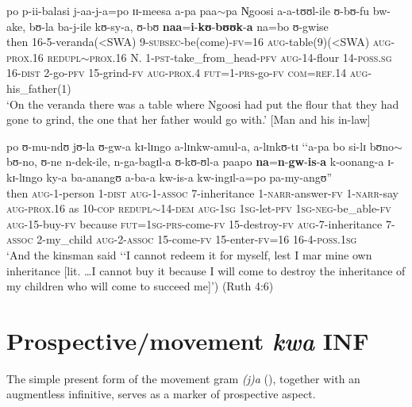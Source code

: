 \begin{exe}
\ex \label{exProclitNaaInLaw} \gll po p-ii-balasi j-aa-j-a=po ɪɪ-meesa a-pa paa$\sim$pa N̩goosi a-a-tʊʊl-ile ʊ-bʊ-fu bw-ake, bʊ-la ba-j-ile kʊ-sy-a, ʊ-bʊ \textbf{naa}=\textbf{i}-\textbf{kʊ}-\textbf{bʊʊk}-\textbf{a} na=bo ʊ-gwise\\
then 16-5-veranda(<SWA) 9-\textsc{subsec}-be(come)-\textsc{fv}=16 \textsc{aug}-table(9)(<SWA) \textsc{aug}-\textsc{prox.16} \textsc{redupl}$\sim$\textsc{prox.16} N. 1-\textsc{pst}-take\_from\_head-\textsc{pfv} \textsc{aug}-14-flour 14-\textsc{poss.sg} 16-\textsc{dist} 2-go-\textsc{pfv} 15-grind-\textsc{fv} \textsc{aug}-\textsc{prox.4} \textsc{fut}=1-\textsc{prs}-go-\textsc{fv} \textsc{com}=\textsc{ref.14} \textsc{aug}-his\_father(1)\\
\glt \lq On the veranda there was a table where Ngoosi had put the flour that they had gone to grind, the one that her father would go with.' [Man and his in-law] %

\ex \label{exProclitNaaRuth}\gll po ʊ-mu-ndʊ jʊ-la ʊ-gw-a kɪ-lɪngo a-lɪnkw-amul-a, a-lɪnkʊ-tɪ \textup{\lq\lq}a-pa bo si-lɪ bʊno$\sim$bʊ-no, ʊ-ne n-dek-ile, n-ga-bagɪl-a ʊ-kʊ-ʊl-a paapo \textbf{na}=\textbf{n}-\textbf{gw}-\textbf{is}-\textbf{a} k-oonang-a ɪ-kɪ-lɪngo ky-a ba-anangʊ a-ba-a kw-is-a kw-ingɪl-a=po pa-my-angʊ\textup{''}\\
then \textsc{aug}-1-person 1-\textsc{dist} \textsc{aug}-1-\textsc{assoc} 7-inheritance 1-\textsc{narr}-answer-\textsc{fv} 1-\textsc{narr}-say \phantom{\lq\lq}\textsc{aug}-\textsc{prox.16} as 10-\textsc{cop} \textsc{redupl}$\sim$14-\textsc{dem} \textsc{aug}-\textsc{1sg} \textsc{1sg}-let-\textsc{pfv} \textsc{1sg}-\textsc{neg}-be\_able-\textsc{fv} \textsc{aug}-15-buy-\textsc{fv} because \textsc{fut}=\textsc{1sg}-\textsc{prs}-come-\textsc{fv} 15-destroy-\textsc{fv} \textsc{aug}-7-inheritance 7-\textsc{assoc} 2-my\_child \textsc{aug}-2-\textsc{assoc} 15-come-\textsc{fv} 15-enter-\textsc{fv}=16 16-4-\textsc{poss.1sg}\\
\glt \lq And the kinsman said \lq\lq I cannot redeem it for myself, lest I mar mine own inheritance [lit. \ldots  I cannot buy it because I will come to destroy the inheritance of my children who will come to succeed me]') (Ruth 4:6)

\end{exe}

\section{Prospective/movement \textit{kwa} INF}
\label{Prospectivekwa}
The simple present form of the movement gram \textit{(j)a} (), together with an augmentless infinitive, serves as a marker of prospective aspect.

